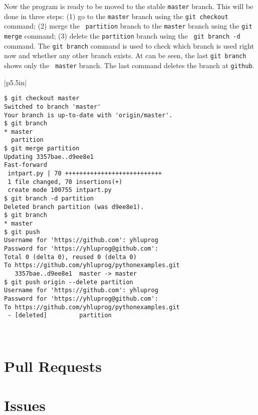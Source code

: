 \resetlinenumber[1]
\linenumbers
\begin{tt}
  
\end{tt}
\nolinenumbers


  
Now the program is ready to be moved to the stable {\tt master}
branch.  This will be done in three steps: (1) go to the {\tt master}
branch using the {\tt git checkout} command; (2) merge the {\tt
  partition} branch to the {\tt master} branch using the {\tt git
  merge} command; (3) delete the {\tt partition} branch using the {\tt
  git branch -d} command.  The {\tt git branch} command is used to
check which branch is used right now and whether any other branch
exists.  At can be seen, the last {\tt git branch} shows only the {\tt
  master} branch.  The last command deletes the branch at {\tt github}.

\vspace{0.2in}
\noindent
\begin{tabular}{|p{5.5in}|}\hline
\begin{verbatim}
$ git checkout master
Switched to branch 'master'
Your branch is up-to-date with 'origin/master'.
$ git branch
* master
  partition
$ git merge partition
Updating 3357bae..d9ee8e1
Fast-forward
 intpart.py | 70 +++++++++++++++++++++++++++
 1 file changed, 70 insertions(+)
 create mode 100755 intpart.py
$ git branch -d partition
Deleted branch partition (was d9ee8e1).
$ git branch
* master
$ git push
Username for 'https://github.com': yhluprog
Password for 'https://yhluprog@github.com': 
Total 0 (delta 0), reused 0 (delta 0)
To https://github.com/yhluprog/pythonexamples.git
   3357bae..d9ee8e1  master -> master
$ git push origin --delete partition
Username for 'https://github.com': yhluprog
Password for 'https://yhluprog@github.com': 
To https://github.com/yhluprog/pythonexamples.git
 - [deleted]         partition
\end{verbatim}
\\ \hline
\end{tabular}
\vspace{0.2in}

\clearpage

\section{Pull Requests}



\section{Issues}
